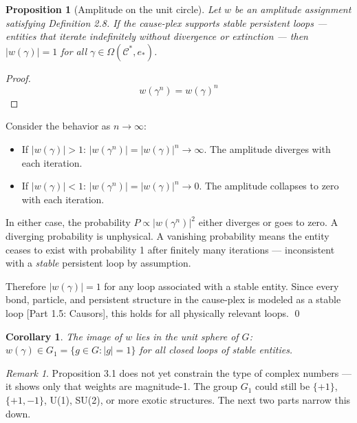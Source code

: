 \documentclass[11pt]{article}
\providecommand{\tightlist}{\setlength{\itemsep}{0pt}\setlength{\parskip}{0pt}}
\newtheorem{proposition}[theorem]{Proposition}
\newtheorem{corollary}[theorem]{Corollary}
\theoremstyle{definition}
\theoremstyle{remark}
\newtheorem{remark}[theorem]{Remark}
\begin{document}
\begin{proposition}[Amplitude on the unit circle]
\label{proposition:3-1}
Let $w$ be an amplitude assignment satisfying Definition 2.8. If the cause-plex supports stable persistent loops — entities that iterate indefinitely without divergence or extinction — then $|w(\gamma)| = 1$ for all $\gamma \in \Omega(\mathcal{C}^{*}, e_{*})$.
\end{proposition}

\begin{proof}
$$w(\gamma^n) = w(\gamma)^n$$
\end{proof}

Consider the behavior as \(n \to \infty\):

\begin{itemize}
\tightlist
\item
  If \(|w(\gamma)| > 1\): \(|w(\gamma^n)| = |w(\gamma)|^n \to \infty\).
  The amplitude diverges with each iteration.
\item
  If \(|w(\gamma)| < 1\): \(|w(\gamma^n)| = |w(\gamma)|^n \to 0\). The
  amplitude collapses to zero with each iteration.
\end{itemize}

In either case, the probability \(P \propto |w(\gamma^n)|^2\) either
diverges or goes to zero. A diverging probability is unphysical. A
vanishing probability means the entity ceases to exist with probability
1 after finitely many iterations --- inconsistent with a \emph{stable}
persistent loop by assumption.

Therefore \(|w(\gamma)| = 1\) for any loop associated with a stable
entity. Since every bond, particle, and persistent structure in the
cause-plex is modeled as a stable loop {[}Part 1.5: Causors{]}, this
holds for all physically relevant loops. \qed

\begin{corollary}
\label{corollary:3-2}
The image of $w$ lies in the unit sphere of $G$: $w(\gamma) \in G_1 = \{g \in G : |g| = 1\}$ for all closed loops of stable entities.

\end{corollary}

\begin{remark}
\label{remark:3-3}
Proposition 3.1 does not yet constrain the type of complex numbers — it shows only that weights are magnitude-1. The group $G_1$ could still be $\{+1\}$, $\{+1,-1\}$, U(1), SU(2), or more exotic structures. The next two parts narrow this down.

\end{remark}
\end{document}
